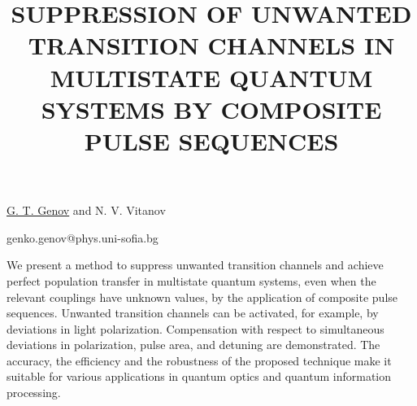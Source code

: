 \title{SUPPRESSION OF UNWANTED TRANSITION CHANNELS IN MULTISTATE QUANTUM SYSTEMS BY COMPOSITE PULSE SEQUENCES}

\underline{G. T. Genov} and N. V. Vitanov  

{\normalsize{

\vspace{-4mm} \unisofia

\email genko.genov@phys.uni-sofia.bg}}

We present a method to suppress unwanted {transition} channels and achieve perfect population transfer in multistate quantum systems, even when the relevant couplings have unknown values, by the application of composite pulse sequences.
Unwanted transition channels can be activated, for example, by deviations in light polarization.
Compensation with respect to simultaneous deviations in polarization, pulse area, and detuning are demonstrated.
The accuracy, the efficiency and the robustness of the proposed technique make it suitable for various applications in quantum optics and quantum information processing.

\vspace{\baselineskip} 